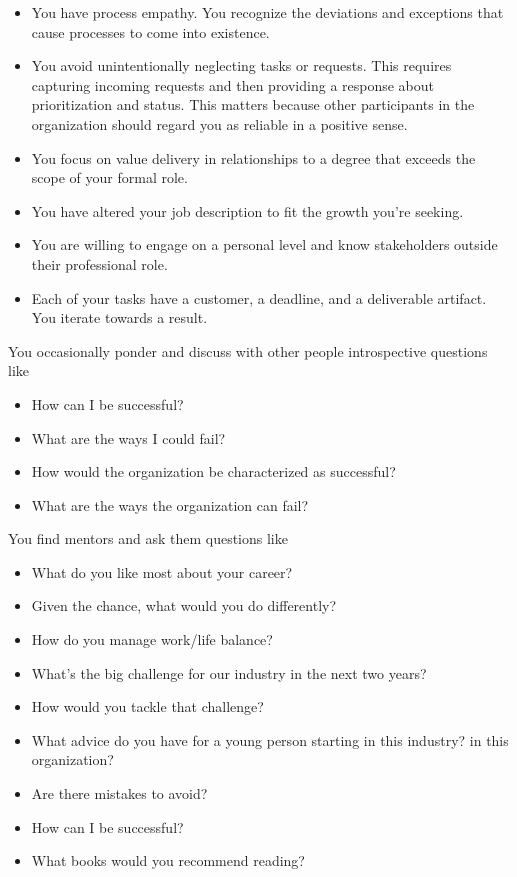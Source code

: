 \begin{itemize}
    \item You have \gls{process empathy}. You recognize the deviations and exceptions that cause processes to come into existence. 
    \item You avoid unintentionally neglecting tasks or requests. This requires capturing incoming requests and then providing a response about prioritization and status. This matters because other participants in the organization should regard you as reliable in a positive sense. 
    \item You focus on value delivery in relationships to a degree that exceeds the scope of your formal role.
\item You have altered your job description to fit the growth you're seeking.
\item You are willing to engage on a personal level and know stakeholders outside their professional role.
\item Each of your tasks have a customer, a deadline, and a deliverable artifact. You iterate towards a result. 
\end{itemize}

You occasionally ponder and discuss with other people introspective questions like
\begin{itemize}
    \item How can I be successful?
    \item What are the ways I could fail?
    \item How would the organization be characterized as successful?
    \item What are the ways the organization can fail?
\end{itemize}
You find mentors and ask them questions like
\begin{itemize}
    \item What do you like most about your career? 
    \item Given the chance, what would you do differently?
    \item How do you manage work/life balance?
    \item What's the big challenge for our industry in the next two years?
    \item How would you tackle that challenge?
    \item What advice do you have for a young person starting in this industry? in this organization? \item Are there mistakes to avoid?  
    \item How can I be successful?
    \item What books would you recommend reading?
\end{itemize}

